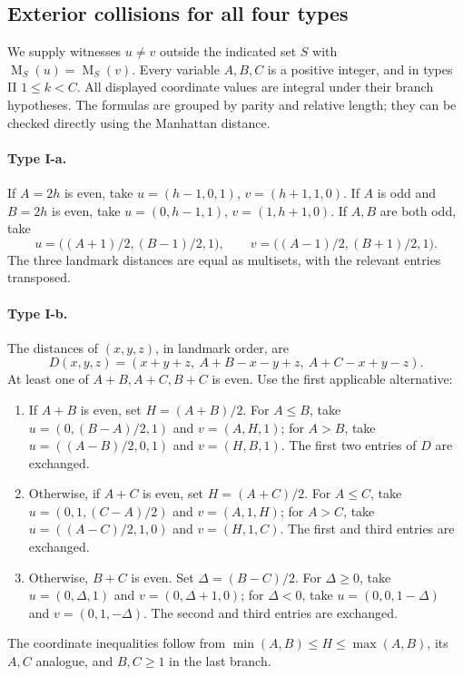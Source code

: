 \documentclass[10pt,a4paper]{article}
\newcommand{\MS}{\operatorname{M}}
\begin{document}
\subsection{Exterior collisions for all four types}\label{sec:witnesses}
We supply witnesses $u\ne v$ outside the indicated set $S$ with $\MS_S(u)=\MS_S(v)$. Every variable $A,B,C$ is a positive integer, and in types II $1\le k<C$. All displayed coordinate values are integral under their branch hypotheses. The formulas are grouped by parity and relative length; they can be checked directly using the Manhattan distance.

\paragraph{Type I-a.} If $A=2h$ is even, take
$u=(h-1,0,1)$, $v=(h+1,1,0)$.
If $A$ is odd and $B=2h$ is even, take
$u=(0,h-1,1)$, $v=(1,h+1,0)$.
If $A,B$ are both odd, take
\[u=\bigl((A+1)/2,(B-1)/2,1\bigr),\qquad
  v=\bigl((A-1)/2,(B+1)/2,1\bigr).
\]
The three landmark distances are equal as multisets, with the relevant entries transposed.

\paragraph{Type I-b.} The distances of $(x,y,z)$, in landmark order, are
\[D(x,y,z)=(x+y+z,\ A+B-x-y+z,\ A+C-x+y-z).\]
At least one of $A+B,A+C,B+C$ is even. Use the first applicable alternative:
\begin{enumerate}[label=(\roman*),leftmargin=2.2em]
\item If $A+B$ is even, set $H=(A+B)/2$.
For $A\le B$, take $u=(0,(B-A)/2,1)$ and $v=(A,H,1)$; for $A>B$, take $u=((A-B)/2,0,1)$ and $v=(H,B,1)$. The first two entries of $D$ are exchanged.
\item Otherwise, if $A+C$ is even, set $H=(A+C)/2$.
For $A\le C$, take $u=(0,1,(C-A)/2)$ and $v=(A,1,H)$; for $A>C$, take $u=((A-C)/2,1,0)$ and $v=(H,1,C)$. The first and third entries are exchanged.
\item Otherwise, $B+C$ is even. Set $\Delta=(B-C)/2$.
For $\Delta\ge0$, take $u=(0,\Delta,1)$ and $v=(0,\Delta+1,0)$; for $\Delta<0$, take $u=(0,0,1-\Delta)$ and $v=(0,1,-\Delta)$. The second and third entries are exchanged.
\end{enumerate}
The coordinate inequalities follow from $\min(A,B)\le H\le\max(A,B)$, its $A,C$ analogue, and $B,C\ge1$ in the last branch.
\end{document}
